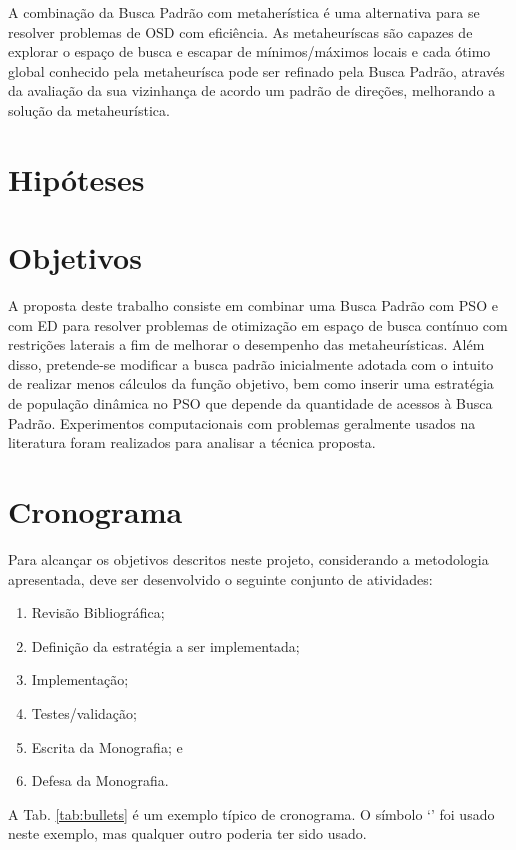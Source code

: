 \documentclass[a4paper,12pt]{monografia}
\theoremstyle{plain}
\theoremstyle{definition}
\theoremstyle{remark}
\begin{document}
A combinação da Busca Padrão com metaherística é uma alternativa para se resolver problemas de OSD com eficiência. As metaheuríscas são capazes de explorar o espaço de busca e escapar de mínimos/máximos locais e cada ótimo global conhecido pela metaheurísca pode ser refinado pela Busca Padrão, através da avaliação da sua vizinhança de acordo um padrão de direções, melhorando a solução da metaheurística.

\section{Hipóteses} %
\section{Objetivos} %
A proposta deste trabalho consiste em combinar uma Busca Padrão com PSO e com ED para resolver
problemas de otimização em espaço de busca contínuo com restrições laterais a fim de melhorar o desempenho das metaheurísticas. Além disso, pretende-se modificar a busca padrão inicialmente adotada com o intuito de realizar menos cálculos da função objetivo, bem como inserir uma estratégia de população dinâmica no PSO que
depende da quantidade de acessos à Busca Padrão. Experimentos computacionais com
problemas geralmente usados na literatura foram realizados para analisar a técnica proposta.


\section{Cronograma}

Para alcançar os objetivos descritos neste projeto, considerando a metodologia apresentada, deve ser desenvolvido o seguinte conjunto de atividades:

\begin{enumerate}
\item Revisão Bibliográfica;
\item Definição da estratégia a ser implementada;
\item Implementação;
\item Testes/validação;
\item Escrita da Monografia; e
\item Defesa da Monografia.
\end{enumerate}

A Tab. \ref{tab:bullets}  é um exemplo típico de cronograma. O símbolo
‘\X’ foi usado neste exemplo, mas qualquer outro poderia ter sido
usado.
\end{document}
